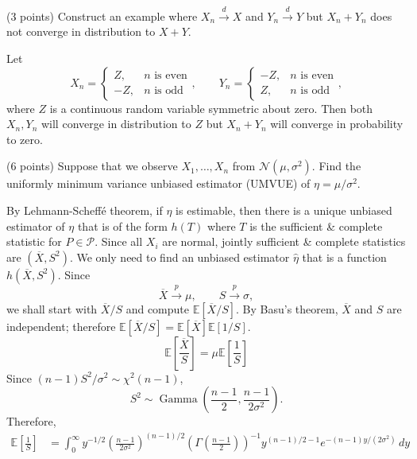 \documentclass[answers]{exam}
\newcommand{\opn}{\operatorname}
\begin{document}
\begin{questions}
   \question
   (3 points) Construct an example where $X_{n} \xrightarrow{d} X$ and $Y_{n} \xrightarrow{d} Y$ but $X_{n} + Y_{n}$ does not converge in distribution to $X+Y$.
   \begin{solution}
      Let
      $$
         X_{n} = \begin{cases} Z, & n\text{ is even}\\ -Z, & n\text{ is odd}\end{cases}, \qquad Y_{n} = \begin{cases} -Z, & n\text{ is even}\\ Z, & n\text{ is odd}\end{cases},
      $$
      where $Z$ is a continuous random variable symmetric about zero. Then both $X_{n}, Y_{n}$ will converge in distribution to $Z$ but $X_{n}+Y_{n}$ will converge in probability to zero.
   \end{solution}
   \question
   (6 points) Suppose that we observe $X_{1}, \ldots , X_{n}$ from $\mathcal{N}\left(\mu, \sigma^{2}\right)$. Find the uniformly minimum variance unbiased estimator (UMVUE) of $\eta = \mu/\sigma^{2}$.
   \begin{solution}
   By Lehmann-Scheffé theorem, if $\eta$ is estimable, then there is a unique unbiased estimator of $\eta$ that is of the form $h\left(T\right)$ where $T$ is the sufficient \& complete statistic for $P\in\mathcal{P}$. Since all $X_{i}$ are normal, jointly sufficient \& complete statistics are $\left(\overline{X}, S^{2}\right)$. We only need to find an unbiased estimator $\hat{\eta}$ that is a function $h\left(\overline{X}, S^{2}\right)$. Since
   $$
   \overline{X} \xrightarrow{p} \mu, \qquad S \xrightarrow{p} \sigma,
   $$
   we shall start with $\overline{X}/S$ and compute $\mathbb{E}\left[\overline{X}/S\right]$. By Basu's theorem, $\overline{X}$ and $S$ are independent; therefore $\mathbb{E}\left[\overline{X}/S\right]=\mathbb{E}\left[\overline{X}\right]\mathbb{E}\left[1/S\right]$.
   $$
      \mathbb{E}\left[\frac{\overline{X}}{S}\right] = \mu\mathbb{E}\left[\frac{1}{S}\right]
   $$
   Since $\left(n-1\right)S^{2}/\sigma^{2} \sim \chi^{2}\left(n-1\right)$,
   $$
   S^{2}\sim \opn{Gamma}\left(\frac{n-1}{2}, \frac{n-1}{2\sigma^{2}}\right).
   $$
   Therefore,
   \begin{align*}
   \mathbb{E}\left[\frac{1}{S}\right] &= \int_{0}^{\infty}y^{-1/2}\left(\frac{n-1}{2\sigma^{2}}\right)^{\left(n-1\right)/2}\left(\Gamma\left(\frac{n-1}{2}\right)\right)^{-1}y^{\left(n-1\right)/2 -1}e^{-\left(n-1\right)y/\left(2\sigma^{2}\right)}\, dy\\

\end{align*}
\end{solution}
\end{questions}
\end{document}
